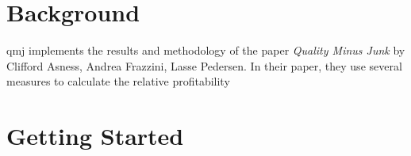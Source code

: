 \documentclass[12pt]{article}
\begin{document}

\section*{Background}
qmj implements the results and methodology of the paper \emph{Quality Minus Junk} by Clifford Asness, Andrea Frazzini, Lasse Pedersen. In their paper, they use several measures to calculate the relative profitability 
\section*{Getting Started}
\end{document}
